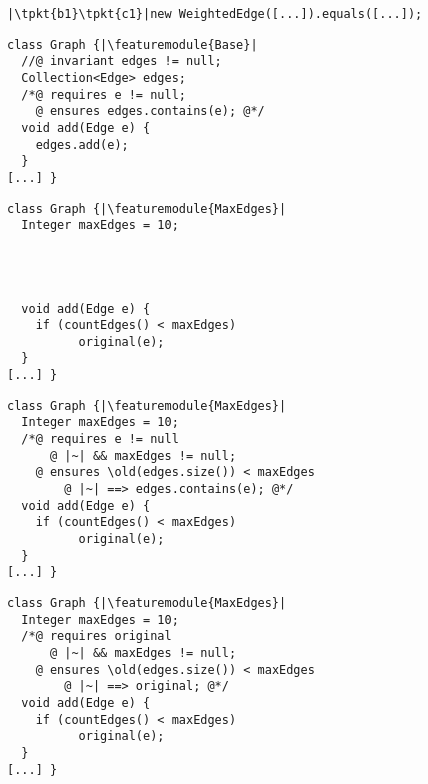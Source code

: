 \newsavebox{\bhthree}
\begin{lrbox}{\bhthree}
	\begin{minipage}{40mm}
\begin{lstlisting}
|\tpkt{b1}\tpkt{c1}|new WeightedEdge([...]).equals([...]);
\end{lstlisting}
	\end{minipage}
\end{lrbox}


\newsavebox{\ecrbase}
\begin{lrbox}{\ecrbase}
	\begin{minipage}{62mm}
\begin{lstlisting}
class Graph {|\featuremodule{Base}|
  //@ invariant edges != null;
  Collection<Edge> edges;
  /*@ requires e != null;
    @ ensures edges.contains(e); @*/
  void add(Edge e) {
    edges.add(e);
  }
[...] }
\end{lstlisting}
	\end{minipage}
\end{lrbox}

\newsavebox{\ecrmaxoc}
\begin{lrbox}{\ecrmaxoc}
	\begin{minipage}{62mm}
\begin{lstlisting}
class Graph {|\featuremodule{MaxEdges}|
  Integer maxEdges = 10;




  void add(Edge e) {
    if (countEdges() < maxEdges)
		  original(e);
  }
[...] }
\end{lstlisting}
	\end{minipage}
\end{lrbox}

\newsavebox{\ecrmaxco}
\begin{lrbox}{\ecrmaxco}
	\begin{minipage}{62mm}
\begin{lstlisting}
class Graph {|\featuremodule{MaxEdges}|
  Integer maxEdges = 10;
  /*@ requires e != null
	  @ |~| && maxEdges != null;
    @ ensures \old(edges.size()) < maxEdges
		@ |~| ==> edges.contains(e); @*/
  void add(Edge e) {
    if (countEdges() < maxEdges)
		  original(e);
  }
[...] }
\end{lstlisting}
	\end{minipage}
\end{lrbox}

\newsavebox{\ecrmax}
\begin{lrbox}{\ecrmax}
	\begin{minipage}{62mm}
\begin{lstlisting}
class Graph {|\featuremodule{MaxEdges}|
  Integer maxEdges = 10;
  /*@ requires original
	  @ |~| && maxEdges != null;
    @ ensures \old(edges.size()) < maxEdges
		@ |~| ==> original; @*/
  void add(Edge e) {
    if (countEdges() < maxEdges)
		  original(e);
  }
[...] }
\end{lstlisting}
	\end{minipage}
\end{lrbox}

